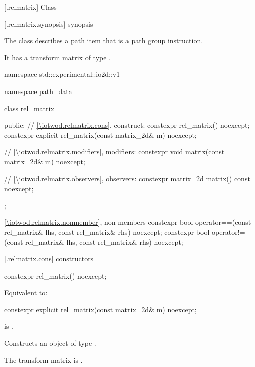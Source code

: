  [\iotwod.relmatrix] {Class }%

 [\iotwod.relmatrix.synopsis] { synopsis}%

\pnum
{}%
The class  describes a path item that is a path group instruction.

\pnum
It has a transform matrix of type .

\begin{codeblock}
namespace std::experimental::io2d::v1 {
  namespace path_data {
    class rel_matrix {
    public:
      // \ref{\iotwod.relmatrix.cons}, construct:
      constexpr rel_matrix() noexcept;
      constexpr explicit rel_matrix(const matrix_2d& m) noexcept;

      // \ref{\iotwod.relmatrix.modifiers}, modifiers:
      constexpr void matrix(const matrix_2d& m) noexcept;

      // \ref{\iotwod.relmatrix.observers}, observers:
      constexpr matrix_2d matrix() const noexcept;
    };
    
    \ref{\iotwod.relmatrix.nonmember}, non-members
    constexpr bool operator==(const rel_matrix& lhs, const rel_matrix& rhs) 
      noexcept;
    constexpr bool operator!=(const rel_matrix& lhs, const rel_matrix& rhs) 
      noexcept;
  }
}
\end{codeblock}

 [\iotwod.relmatrix.cons] { constructors}

%
\begin{itemdecl}
constexpr rel_matrix() noexcept;
\end{itemdecl}
\begin{itemdescr}
\pnum
\effects
Equivalent to: 
\end{itemdescr}

%
\begin{itemdecl}
constexpr explicit rel_matrix(const matrix_2d& m) noexcept;
\end{itemdecl}
\begin{itemdescr}
\pnum
\requires
{} is .

\pnum
\effects
Constructs an object of type .

\pnum
The transform matrix is .
\end{itemdescr}

